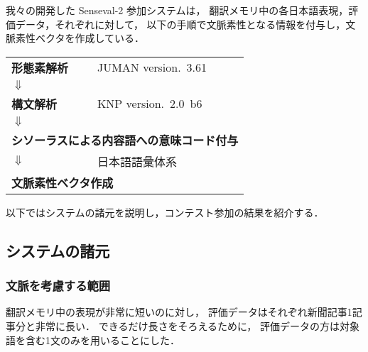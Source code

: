 我々の開発した {\sc Senseval}-2 参加システムは，
翻訳メモリ中の各日本語表現，評価データ，それぞれに対して，
以下の手順で文脈素性となる情報を付与し，文脈素性ベクタを作成している．

\begin{center}
 \begin{tabular}{p{}l}
  {\bf 形態素解析} & JUMAN version.\ 3.61 \cite{kurohashi:98-1}\\
  \hspace*{2zw}$\Downarrow$\\
  {\bf 構文解析} & KNP version.\ 2.0~b6 \cite{kurohashi:98-2}\\
  \hspace*{2zw}$\Downarrow$\\
  \multicolumn{2}{l}{\bf シソーラスによる内容語への意味コード付与}
  \\
  \hspace*{2zw}$\Downarrow$ & 日本語語彙体系 \cite{ikehara:97}\\
  \multicolumn{2}{l}{\bf 文脈素性ベクタ作成}
 \end{tabular}
\end{center}

以下ではシステムの諸元を説明し，コンテスト参加の結果を紹介する．

\subsection{システムの諸元}

\subsubsection{文脈を考慮する範囲}
翻訳メモリ中の表現が非常に短いのに対し，
評価データはそれぞれ新聞記事1記事分と非常に長い．
できるだけ長さをそろえるために，
評価データの方は対象語を含む1文のみを用いることにした．


